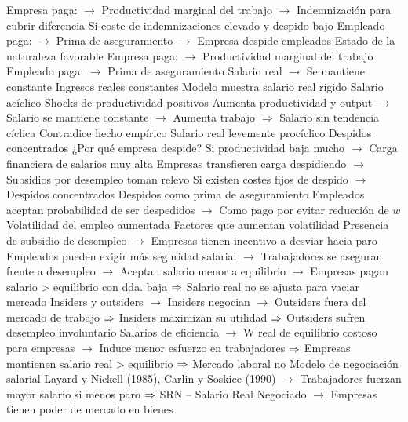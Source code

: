 \documentclass{nuevotema}
\begin{document}
\begin{esquemal}
				\4[] Empresa paga:
				\4[] $\to$ Productividad marginal del trabajo
				\4[] $\to$ Indemnización para cubrir diferencia
				\4[] Si coste de indemnizaciones elevado y despido bajo
				\4[] Empleado paga:
				\4[] $\to$ Prima de aseguramiento
				\4[] $\to$ Empresa despide empleados
				\4 Estado de la naturaleza favorable
				\4[] Empresa paga:
				\4[] $\to$ Productividad marginal del trabajo
				\4[] Empleado paga:
				\4[] $\to$ Prima de aseguramiento
				\4[] Salario real
				\4[] $\to$ Se mantiene constante
				\4 Ingresos reales constantes
				\4[]  Modelo muestra salario real rígido
				\4[]  Salario acíclico
				\4 Shocks de productividad positivos
				\4[] Aumenta productividad y output
				\4[] $\to$ Salario se mantiene constante
				\4[] $\to$ Aumenta trabajo
				\4[] $\Rightarrow$ Salario sin tendencia cíclica
				\4 Contradice hecho empírico
				\4[] Salario real levemente procíclico
				\4 Despidos concentrados
				\4 ¿Por qué empresa despide?
				\4[] Si productividad baja mucho
				\4[] $\to$ Carga financiera de salarios muy alta
				\4 Empresas transfieren carga despidiendo
				\4[] $\to$ Subsidios por desempleo toman relevo
				\4[] Si existen costes fijos de despido
				\4[] $\to$ Despidos concentrados
				\4 Despidos como prima de aseguramiento
				\4[] Empleados aceptan probabilidad de ser despedidos
				\4[] $\to$ Como pago por evitar reducción de $w$
				\4 Volatilidad del empleo aumentada
				\4 Factores que aumentan volatilidad
				\4[] Presencia de subsidio de desempleo
				\4[] $\to$ Empresas tienen incentivo a desviar hacia paro
				\4[] Empleados pueden exigir más seguridad salarial
				\4[] $\to$ Trabajadores se aseguran frente a desempleo
				\4[] $\to$ Aceptan salario menor a equilibrio
				\4[] $\to$ Empresas pagan salario > equilibrio con dda. baja
				\4[] $\Rightarrow$ Salario real no se ajusta para vaciar mercado
			\3 Insiders y outsiders
				\4[] $\to$ Insiders negocian
				\4[] $\to$ Outsiders fuera del mercado de trabajo
				\4[] $\Rightarrow$ Insiders maximizan su utilidad
				\4[] $\Rightarrow$ Outsiders sufren desempleo involuntario
			\3 Salarios de eficiencia
				\4[] $\to$ W real de equilibrio costoso para empresas
				\4[] $\to$ Induce menor esfuerzo en trabajadores
				\4[] $\Rightarrow$ Empresas mantienen salario real > equilibrio
				\4[] $\Rightarrow$ Mercado laboral no
			\3 Modelo de negociación salarial
				\4 Layard y Nickell (1985), Carlin y Soskice (1990)
				\4[] $\to$ Trabajadores fuerzan mayor salario si menos paro
				\4[] $\Rightarrow$ SRN -- Salario Real Negociado
				\4[] $\to$ Empresas tienen poder de mercado en bienes

\end{esquemal}
\end{document}
